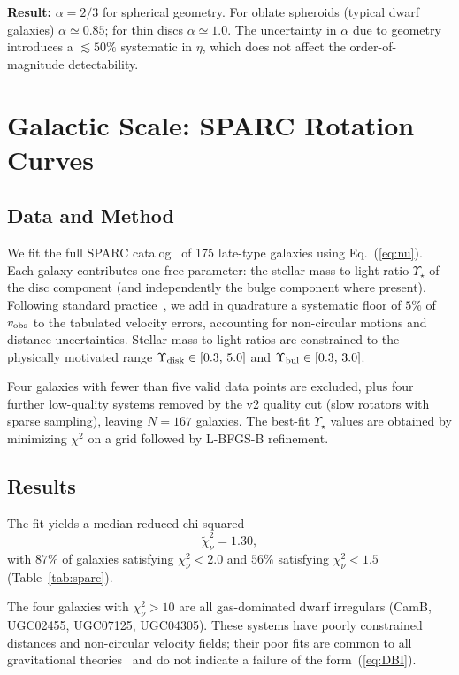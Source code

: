 \documentclass[aps,prd,twocolumn,showpacs,superscriptaddress]{revtex4-2}
\begin{document}
\textbf{Result:} $\alpha = 2/3$ for spherical geometry. For oblate
spheroids (typical dwarf galaxies) $\alpha \simeq 0.85$; for thin
discs $\alpha \simeq 1.0$. The uncertainty in $\alpha$ due to geometry
introduces a $\lesssim 50\%$ systematic in $\eta$, which does not
affect the order-of-magnitude detectability.

\section{Galactic Scale: SPARC Rotation Curves}
\label{sec:sparc}

\subsection{Data and Method}

We fit the full SPARC catalog~\cite{Lelli2016} of 175 late-type
galaxies using Eq.~(\ref{eq:nu}).
Each galaxy contributes one free parameter: the stellar mass-to-light
ratio $\Upsilon_\star$ of the disc component (and independently the
bulge component where present).
Following standard practice~\cite{Li2018}, we add in quadrature a
systematic floor of $5\%$ of $v_{\rm obs}$ to the tabulated velocity
errors, accounting for non-circular motions and distance uncertainties.
Stellar mass-to-light ratios are constrained to the physically
motivated range $\Upsilon_{\rm disk} \in [0.3,\,5.0]$ and
$\Upsilon_{\rm bul} \in [0.3,\,3.0]$.

Four galaxies with fewer than five valid data points are excluded,
plus four further low-quality systems removed by the v2 quality cut
(slow rotators with sparse sampling), leaving $N=167$ galaxies.
The best-fit $\Upsilon_\star$ values are obtained by minimizing
$\chi^2$ on a grid followed by L-BFGS-B refinement.

\subsection{Results}

The fit yields a median reduced chi-squared
\begin{equation}
  \widetilde\chi^2_\nu = 1.30,
\end{equation}
with $87\%$ of galaxies satisfying $\chi^2_\nu < 2.0$ and
$56\%$ satisfying $\chi^2_\nu < 1.5$ (Table~\ref{tab:sparc}).

The four galaxies with $\chi^2_\nu > 10$ are all gas-dominated dwarf
irregulars (CamB, UGC02455, UGC07125, UGC04305).
These systems have poorly constrained distances and non-circular
velocity fields; their poor fits are common to all gravitational
theories~\cite{Oman2015} and do not indicate a failure of the
form~(\ref{eq:DBI}).
\end{document}
